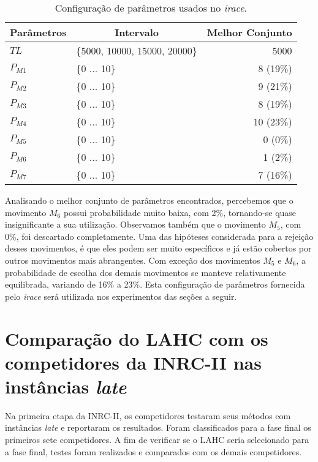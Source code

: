 \documentclass[cic,tc, twoside]{iiufrgs}
\begin{document}
\begin{table}[ht!]
\centering
\small
\caption{Configuração de parâmetros usados no \textit{irace}.}
\begin{tabular}{llr}
\toprule
    \textbf{Parâmetros} & \multicolumn{1}{c}{\textbf{Intervalo}} & \multicolumn{1}{c}{\textbf{Melhor Conjunto}}\\
     \hline
    $TL$ & \{5000, 10000, 15000, 20000\} & 5000\\
    $P_{M1}$ & \{0 ... 10\} & 8 (19\%)\\
    $P_{M2}$ & \{0 ... 10\} & 9 (21\%)\\
    $P_{M3}$ & \{0 ... 10\} & 8 (19\%)\\
    $P_{M4}$ & \{0 ... 10\} & 10 (23\%)\\
    $P_{M5}$ & \{0 ... 10\} & 0 (0\%)\\
    $P_{M6}$ & \{0 ... 10\} & 1 (2\%)\\
    $P_{M7}$ & \{0 ... 10\} & 7 (16\%)\\
   \bottomrule
\end{tabular}
\label{tab:iraceParam}
\end{table}


\newpage
Analisando o melhor conjunto de parâmetros encontrados, percebemos que o movimento $M_6$ possui probabilidade muito baixa, com 2\%, tornando-se quase insignificante a sua utilização. 
Observamos também que o movimento $M_5$, com 0\%, foi descartado completamente. Uma das hipóteses considerada para a rejeição desses movimentos, é que eles podem ser muito específicos e já estão cobertos por outros movimentos mais abrangentes. 
Com exceção dos movimentos $M_5$ e $M_6$, a probabilidade de escolha dos demais movimentos se manteve relativamente equilibrada, variando de 16\% a 23\%. 
Esta configuração de parâmetros fornecida pelo \emph{irace} será utilizada nos experimentos das seções a seguir.

\section{Comparação do LAHC com os competidores da INRC-II nas instâncias \textit{late}}

Na primeira etapa da INRC-II, os competidores testaram seus métodos com instâncias \textit{late} e reportaram os resultados. Foram classificados para a fase final os primeiros sete competidores. A fim de verificar se o LAHC seria selecionado para a fase final, testes foram realizados e comparados com os demais competidores.
\end{document}
